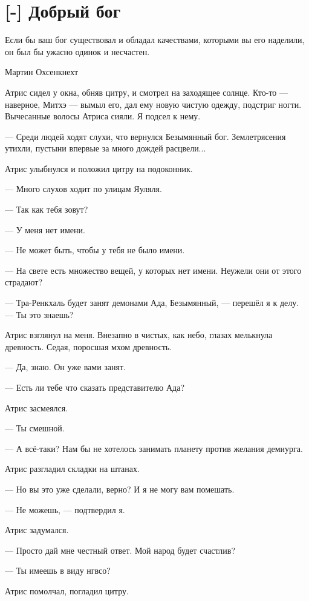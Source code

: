\section{[-] Добрый бог}

\epigraph
{Если бы ваш бог существовал и обладал качествами, которыми вы его наделили, он был бы ужасно одинок и несчастен.}
{Мартин Охсенкнехт}

\textspace

Атрис сидел у окна, обняв цитру, и смотрел на заходящее солнце.
Кто-то --- наверное, Митхэ --- вымыл его, дал ему новую чистую одежду, подстриг ногти.
Вычесанные волосы Атриса сияли.
Я подсел к нему.

--- Среди людей ходят слухи, что вернулся Безымянный бог.
Землетрясения утихли, пустыни впервые за много дождей расцвели...

Атрис улыбнулся и положил цитру на подоконник.

--- Много слухов ходит по улицам Яуляля.

--- Так как тебя зовут?

--- У меня нет имени.

--- Не может быть, чтобы у тебя не было имени.

--- На свете есть множество вещей, у которых нет имени.
Неужели они от этого страдают?

--- Тра-Ренкхаль будет занят демонами Ада, Безымянный, --- перешёл я к делу.
--- Ты это знаешь?

Атрис взглянул на меня.
Внезапно в чистых, как небо, глазах мелькнула древность.
Седая, поросшая мхом древность.

--- Да, знаю.
Он уже вами занят.

--- Есть ли тебе что сказать представителю Ада?

Атрис засмеялся.

--- Ты смешной.

--- А всё-таки?
Нам бы не хотелось занимать планету против желания демиурга.

Атрис разгладил складки на штанах.

--- Но вы это уже сделали, верно?
И я не могу вам помешать.

--- Не можешь, --- подтвердил я.

Атрис задумался.

--- Просто дай мне честный ответ.
Мой народ будет счастлив?

--- Ты имеешь в виду нгвсо?

Атрис помолчал, погладил цитру.

